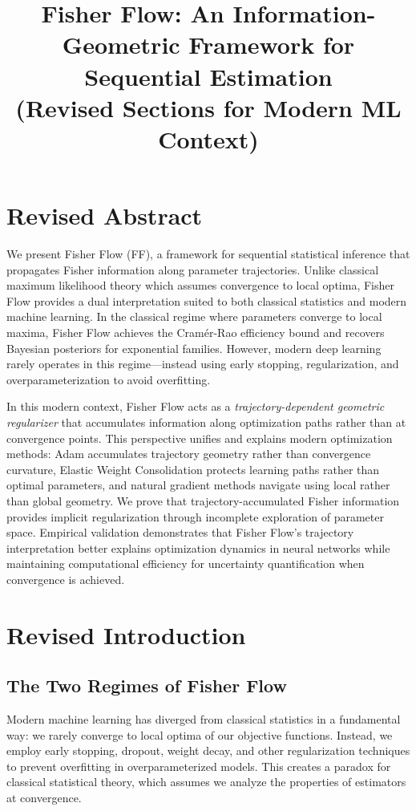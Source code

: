 \documentclass[11pt]{article}
\title{Fisher Flow: An Information-Geometric Framework for Sequential Estimation\\
\large (Revised Sections for Modern ML Context)}
\begin{document}
\section*{Revised Abstract}

We present Fisher Flow (FF), a framework for sequential statistical inference that propagates Fisher information along parameter trajectories. Unlike classical maximum likelihood theory which assumes convergence to local optima, Fisher Flow provides a dual interpretation suited to both classical statistics and modern machine learning. In the classical regime where parameters converge to local maxima, Fisher Flow achieves the Cramér-Rao efficiency bound and recovers Bayesian posteriors for exponential families. However, modern deep learning rarely operates in this regime—instead using early stopping, regularization, and overparameterization to avoid overfitting. 

In this modern context, Fisher Flow acts as a \emph{trajectory-dependent geometric regularizer} that accumulates information along optimization paths rather than at convergence points. This perspective unifies and explains modern optimization methods: Adam accumulates trajectory geometry rather than convergence curvature, Elastic Weight Consolidation protects learning paths rather than optimal parameters, and natural gradient methods navigate using local rather than global geometry. We prove that trajectory-accumulated Fisher information provides implicit regularization through incomplete exploration of parameter space. Empirical validation demonstrates that Fisher Flow's trajectory interpretation better explains optimization dynamics in neural networks while maintaining computational efficiency for uncertainty quantification when convergence is achieved.

\section*{Revised Introduction}

\subsection*{The Two Regimes of Fisher Flow}

Modern machine learning has diverged from classical statistics in a fundamental way: we rarely converge to local optima of our objective functions. Instead, we employ early stopping, dropout, weight decay, and other regularization techniques to prevent overfitting in overparameterized models. This creates a paradox for classical statistical theory, which assumes we analyze the properties of estimators at convergence.
\end{document}
